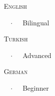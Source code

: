 \documentclass{scrartcl}
\newcommand{\Description}[1]{\noindent\footnotesize{#1}\par\normalsize\vspace{1em}} %
\begin{document}
\begin{cv}{}
\Description{\parbox{\langbox}{\textsc{English}}\ \ $\cdotp$\ \ \ Bilingual}

\vspace{-0.5em} %

\Description{\parbox{\langbox}{\textsc{Turkish}}\ \ $\cdotp$\ \ \ Advanced}

\vspace{-0.5em} %

\Description{\parbox{\langbox}{\textsc{German}}\ \ $\cdotp$\ \ \ Beginner}

\vspace{1em} %




\end{cv}
\end{document}
